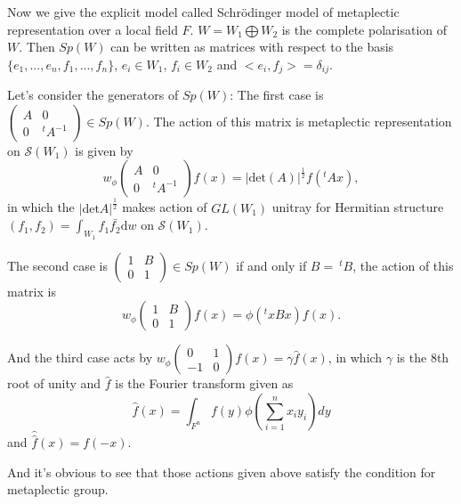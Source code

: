 \documentclass[12pt,a4paper,english]{article}
\theoremstyle{plain}
\theoremstyle{definition}
\begin{document}
Now we give the explicit model called Schr\"odinger model of metaplectic representation over a local field $F$. $W=W_{1}\bigoplus W_{2}$ is the complete polarisation of $W$. 
Then $Sp(W)$ can be written as matrices with respect to the basis $\{e_{1},...,e_{n},f_{1},...,f_{n}\}$, $e_{i}\in W_{1}$, $f_{i}\in W_{2}$ and $<e_{i},f_{j}>=\delta_{ij}$.

Let's consider the generators of $Sp(W)$:
The first case is 
$\begin{pmatrix}
A & 0\\
0 & ^{t}A^{-1}
\end{pmatrix}\in Sp(W)$. The action of this matrix is metaplectic representation on $\mathcal{S}(W_{1})$ is given by 
\begin{equation*}
    w_{\phi}
    \begin{pmatrix}
    A & 0\\
    0 & ^{t}A^{-1}
    \end{pmatrix}f(x)=|\text{det}(A)|^{\frac{1}{2}}f(^{t}Ax),
\end{equation*}
in which the $|\text{det}A|^{\frac{1}{2}}$ makes action of $GL(W_{1})$ unitray for Hermitian structure $(f_{1},f_{2})=\int_{W_{1}}f_{1}\bar{f_{2}}\text{d} w$ on $\mathcal{S}(W_{1})$.

The second case is $\begin{pmatrix}
1 & B\\
0& 1
\end{pmatrix}\in Sp(W)$ if and only if $B=\ ^{t}B$, the action of this matrix is 
\begin{equation*}
    w_{\phi}\begin{pmatrix}
    1 & B\\
    0 &1
    \end{pmatrix}f(x)=\phi(^{t}xBx)f(x).
\end{equation*}

And the third case acts by $w_{\phi}\begin{pmatrix}
0 & 1 \\
-1 & 0
\end{pmatrix}f(x)=\gamma \hat{f}(x)$, in which $\gamma$ is the 8th root of unity and $\hat{f}$ is the Fourier transform given as 
\begin{equation*}
    \hat{f}(x)=\int_{F^{n}} f(y)\phi(\sum^{n}_{i=1}x_{i}y_{i})dy
\end{equation*}
and $\hat{\hat{f}}(x)=f(-x)$.

And it's obvious to see that those actions given above satisfy the condition for metaplectic group.
\end{document}
